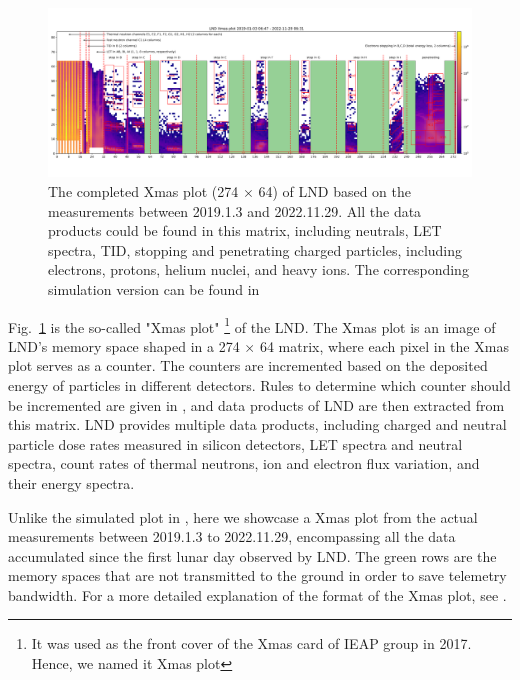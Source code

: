 \begin{figure}
    \centering
    \includegraphics[width =0.95\textheight, height = 0.4\textheight, angle = 90]{images/xmas-2019-01-03To2022-11-29.png}
    \caption[\ac{LND} Xmas plot from measurements]{The completed Xmas plot (274 $\times$ 64) of \ac{LND} based on the measurements between 2019.1.3 and 2022.11.29. All the data products could be found in this matrix, including neutrals, \ac{LET} spectra, \ac{TID}, stopping and penetrating charged particles, including electrons, protons, helium nuclei, and heavy ions. The corresponding simulation version can be found in \citet{Wimmer2020SSRv}}
    \label{Fig:measurement_Xmas}
\end{figure}

Fig.~\ref{Fig:measurement_Xmas} is the so-called "Xmas plot" \footnote{It was used as the front cover of the Xmas card of IEAP group in 2017. Hence, we named it Xmas plot} of the \ac{LND}. The Xmas plot is an image of \ac{LND}'s memory space shaped in a 274 $\times$ 64 matrix, where each pixel in the Xmas plot serves as a counter. The counters are incremented based on the deposited energy of particles in different detectors. Rules to determine which counter should be incremented are given in \citet{Wimmer2020SSRv}, and data products of \ac{LND} are then extracted from this matrix. 
\ac{LND} provides multiple data products, including charged and neutral particle dose rates measured in silicon detectors, \ac{LET} spectra and neutral spectra, count rates of thermal neutrons, ion and electron flux variation, and their energy spectra.
 
Unlike the simulated plot in \citet{Wimmer2020SSRv}, here we showcase a Xmas plot from the actual measurements between 2019.1.3 to 2022.11.29, encompassing all the data accumulated since the first lunar day observed by \ac{LND}. The green rows are the memory spaces that are not transmitted to the ground in order to save telemetry bandwidth. 
For a more detailed explanation of the format of the Xmas plot, see \citet{Wimmer2020SSRv}.

